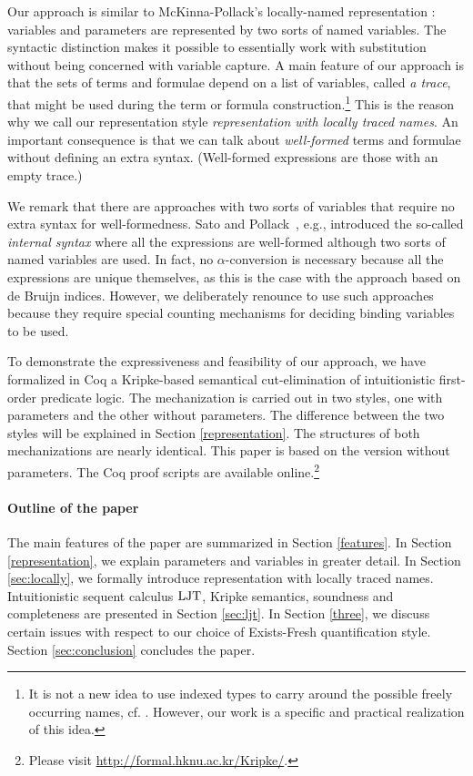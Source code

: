 \documentclass{svjour3}                     %
\newcommand{\ljt}{\textup{LJT}}
\begin{document}
Our approach is similar to McKinna-Pollack's locally-named
representation \cite{mcpol93,mcpol99}: variables and parameters are
represented by two sorts of named variables. The syntactic distinction
makes it possible to essentially work with substitution without being
concerned with variable capture.
A main feature of our approach is that the sets of terms and formulae
depend on a list of variables, called {\em a trace}, that might be used
during the term or formula construction.\footnote{It is not a
  new idea to use indexed types to carry around the possible freely occurring
  names, cf. \cite{BelleHook,AltReus,BrideKinna}. However, our work is a
specific and practical realization of this idea.} This is the reason why we call our representation style \textit{representation with locally traced names}. An important consequence is that we can talk about \textit{well-formed} terms and formulae without defining an extra syntax. (Well-formed expressions are those with an empty trace.)

We remark that there are approaches with two sorts of variables that require no extra syntax for well-formedness. Sato and Pollack~\cite{sapol}, e.g., introduced the so-called \textit{internal syntax} where all the expressions are well-formed although two sorts of named variables are used. In fact, no $\alpha$-conversion is necessary because all the expressions are unique themselves, as this is the case with the approach based on de Bruijn indices. However, we deliberately renounce to use such approaches because they require special counting mechanisms for deciding binding variables to be used.

To demonstrate the expressiveness and feasibility of our approach, we have formalized in Coq a Kripke-based semantical cut-elimination of intuitionistic first-order predicate logic. 
The mechanization is carried out in two styles, one with parameters and
the other without parameters.
The difference between the two styles will be explained in Section \ref{representation}.
The structures of both mechanizations are nearly identical. This paper is based on the version without parameters.
The Coq proof scripts are available
online.\footnote{Please visit \url{http://formal.hknu.ac.kr/Kripke/}.} 

\paragraph{Outline of the paper}
The main features of the paper are summarized in Section \ref{features}. In Section \ref{representation}, we explain  parameters and variables in greater detail. In Section \ref{sec:locally}, we formally introduce representation with locally traced names. Intuitionistic sequent calculus $\ljt$, Kripke semantics, soundness and completeness are presented in Section \ref{sec:ljt}. In Section \ref{three}, we discuss certain issues with respect to our choice of Exists-Fresh quantification style. Section \ref{sec:conclusion} concludes the paper.
\end{document}
